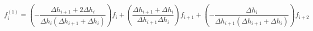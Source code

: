 \begin{equation} 
f^{{(1)}}_{i} = \left(- \frac{\Delta h_{{i+1}} + 2 \Delta h_{{i}}}{\Delta h_{{i}} \left(\Delta h_{{i+1}} + \Delta h_{{i}}\right)}\right)f_{{i}}+ \left(\frac{\Delta h_{{i+1}} + \Delta h_{{i}}}{\Delta h_{{i+1}} \Delta h_{{i}}}\right)f_{{i+1}}+ \left(- \frac{\Delta h_{{i}}}{\Delta h_{{i+1}} \left(\Delta h_{{i+1}} + \Delta h_{{i}}\right)}\right)f_{{i+2}}
 \end{equation} 
